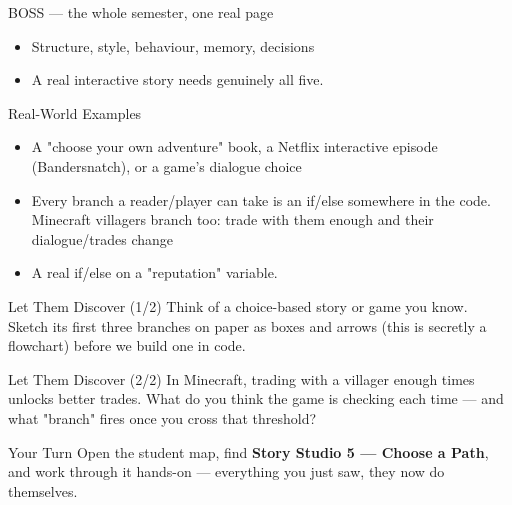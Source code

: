 \documentclass[aspectratio=169]{beamer}
\begin{document}
\begin{frame}{BOSS — the whole semester, one real page}
    \large
    \begin{itemize}
        \item Structure, style, behaviour, memory, decisions
        \item A real interactive story needs genuinely all five.
    \end{itemize}
\end{frame}

\begin{frame}{Real-World Examples}
    \large
    \begin{itemize}
        \item A "choose your own adventure" book, a Netflix interactive episode (Bandersnatch), or a game's dialogue choice
        \item Every branch a reader/player can take is an if/else somewhere in the code. Minecraft villagers branch too: trade with them enough and their dialogue/trades change
        \item A real if/else on a "reputation" variable.
    \end{itemize}
\end{frame}


\begin{frame}{Let Them Discover (1/2)}
    \Large
    Think of a choice-based story or game you know. Sketch its first three branches on paper as boxes and arrows (this is secretly a flowchart) before we build one in code.
\end{frame}


\begin{frame}{Let Them Discover (2/2)}
    \Large
    In Minecraft, trading with a villager enough times unlocks better trades. What do you think the game is checking each time — and what "branch" fires once you cross that threshold?
\end{frame}

\begin{frame}{Your Turn}
    \Large
    Open the student map, find \textbf{Story Studio 5 — Choose a Path}, and work through it
    hands-on --- everything you just saw, they now do themselves.
\end{frame}
\end{document}
